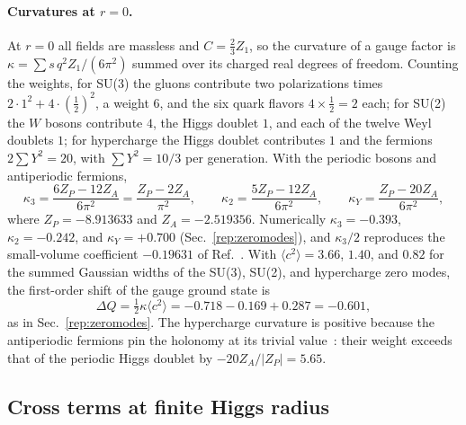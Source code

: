 \paragraph{Curvatures at $r=0$.}
At $r=0$ all fields are massless and $C=\frac23Z_1$, so the curvature of a gauge factor is $\kappa=\sum s\,q^2Z_1/(6\pi^2)$ summed over its charged real degrees of freedom.
Counting the weights, for SU(3) the gluons contribute two polarizations times $2\cdot1^2+4\cdot(\frac12)^2$, a weight $6$, and the six quark flavors $4\times\frac12=2$ each; for SU(2) the $W$ bosons contribute $4$, the Higgs doublet $1$, and each of the twelve Weyl doublets $1$; for hypercharge the Higgs doublet contributes $1$ and the fermions $2\sum Y^2=20$, with $\sum Y^2=10/3$ per generation.
With the periodic bosons and antiperiodic fermions,
\begin{equation}
\kappa_3=\frac{6Z_P-12Z_A}{6\pi^2}=\frac{Z_P-2Z_A}{\pi^2},\qquad \kappa_2=\frac{5Z_P-12Z_A}{6\pi^2},\qquad
\kappa_Y=\frac{Z_P-20Z_A}{6\pi^2},
\label{eq:rb-kappas}
\end{equation}
where $Z_P=-8.913633$ and $Z_A=-2.519356$. %
Numerically $\kappa_3=-0.393$, $\kappa_2=-0.242$, and $\kappa_Y=+0.700$ (Sec.~\ref{rep:zeromodes}), and $\kappa_3/2$ reproduces the small-volume coefficient $-0.19631$ of Ref.~\cite{vanBaal:1988va}. %
With $\langle c^2\rangle=3.66$, $1.40$, and $0.82$ for the summed Gaussian widths of the SU(3), SU(2), and hypercharge zero modes, the first-order shift of the gauge ground state is %
\begin{equation}
\Delta Q=\tfrac12\kappa\langle c^2\rangle=-0.718-0.169+0.287=-0.601,
\label{eq:rb-DQ}
\end{equation}
as in Sec.~\ref{rep:zeromodes}. %
The hypercharge curvature is positive because the antiperiodic fermions pin the holonomy at its trivial value~\cite{vanBaal:1988va}: their weight exceeds that of the periodic Higgs doublet by $-20Z_A/|Z_P|=5.65$. %

\subsection{Cross terms at finite Higgs radius}
\label{sec:rb-hessian}


